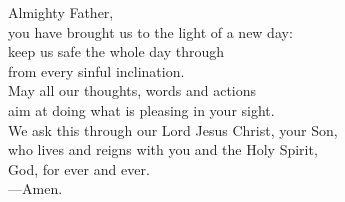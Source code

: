 \prayer


\begin{prayerverse}
Almighty Father,\\
you have brought us to the light of a new day:\\
keep us safe the whole day through\\
from every sinful inclination.\\
May all our thoughts, words and actions\\
aim at doing what is pleasing in your sight.\\
We ask this through our Lord Jesus Christ, your Son,\\
who lives and reigns with you and the Holy Spirit,\\
God, for ever and ever.\\
{\color{red}---\thinspace}Amen.
\end{prayerverse}

